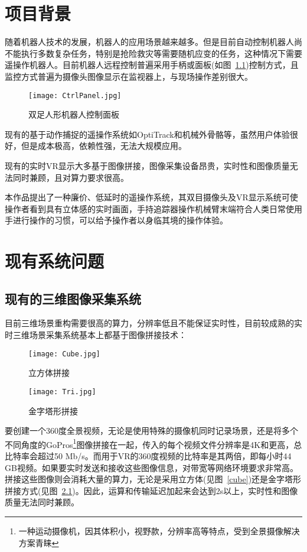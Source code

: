 \chapter{项目背景}

随着机器人技术的发展，机器人的应用场景越来越多。但是目前自动控制机器人尚不能执行多数复杂任务，特别是抢险救灾等需要随机应变的任务，这种情况下需要遥操作机器人。目前机器人远程控制普遍采用手柄或面板(如图~\ref{panal})控制方式，且监控方式普遍为摄像头图像显示在监视器上，与现场操作差别很大。

\begin{figure}[htbp]
\centering
\texttt{[image: CtrlPanel.jpg]}
\caption{双足人形机器人控制面板} 
\label{panal}
\end{figure}

现有的基于动作捕捉的遥操作系统如OptiTrack和机械外骨骼等，虽然用户体验很好，但是成本极高，依赖性强，无法大规模应用。

现有的实时VR显示大多基于图像拼接，图像采集设备昂贵，实时性和图像质量无法同时兼顾，且对算力要求很高。

本作品提出了一种廉价、低延时的遥操作系统，其双目摄像头及VR显示系统可使操作者看到具有立体感的实时画面，手持追踪器操作机械臂末端符合人类日常使用手进行操作的习惯，可以给予操作者以身临其境的操作体验。


\chapter{现有系统问题}

\section{现有的三维图像采集系统}

目前三维场景重构需要很高的算力，分辨率低且不能保证实时性，目前较成熟的实时三维场景采集系统基本上都基于图像拼接技术：

\begin{figure}
\begin{minipage}{0.48\textwidth}
  \centering
  \texttt{[image: Cube.jpg]}
  \caption{立方体拼接}
  \label{cube}
\end{minipage}\hfill
\begin{minipage}{0.48\textwidth}
  \centering
  \texttt{[image: Tri.jpg]}
  \caption{金字塔形拼接}
  \label{tri}
\end{minipage}
\end{figure}

要创建一个360度全景视频，无论是使用特殊的摄像机同时记录场景，还是将多个不同角度的GoPros\footnote{一种运动摄像机，因其体积小，视野款，分辨率高等特点，受到全景摄像解决方案青睐}图像拼接在一起，传入的每个视频文件分辨率是4K和更高，总比特率会超过50 Mb/s。而用于VR的360度视频的比特率是其两倍，即每小时44 GB视频。如果要实时发送和接收这些图像信息，对带宽等网络环境要求非常高。拼接这些图像则会消耗大量的算力，无论是采用立方体(见图~\ref{cube})还是金字塔形拼接方式(见图~\ref{tri})。因此，运算和传输延迟加起来会达到2s以上，实时性和图像质量无法同时兼顾。

